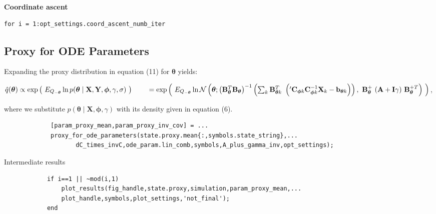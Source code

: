 \item \textbf{Coordinate ascent}
\color{RoyalPurple}\begin{verbatim}
for i = 1:opt_settings.coord_ascent_numb_iter
\end{verbatim} 
\color{black}
\subsection{Proxy for ODE Parameters}


 Expanding the proxy distribution in equation (11) for $\boldsymbol\theta$ yields:
    \vspace{1em}
    \begin{par}
$\hat{q}(\boldsymbol\theta) \propto \exp
\left( ~E_{Q_{-\boldsymbol\theta}}     \ln p(\boldsymbol\theta \mid \mathbf{X},\mathbf{Y},\boldsymbol\phi,\gamma,\mathbf\sigma)
~     \right) \\ \qquad= \exp \left( ~E_{Q_{-\boldsymbol\theta}} \ln \mathcal{N}\left(\boldsymbol\theta
; \left(    \mathbf{B}_{\boldsymbol\theta}^T \mathbf{B}_{\boldsymbol\theta} \right)^{-1}
\left( \sum_k    \mathbf{B}_{\boldsymbol\theta k}^T ~ \left( {'\mathbf{C}_{\boldsymbol\phi
k}}    \mathbf{C}_{\boldsymbol\phi k}^{-1} \mathbf{X}_k - \mathbf{b}_{\boldsymbol\theta
k} \right)    \right), ~ \mathbf{B}_{\boldsymbol\theta}^+ ~ (\mathbf{A} + \mathbf{I}\gamma)
~    \mathbf{B}_{\boldsymbol\theta}^{+T} \right) ~\right)$,
    \end{par}
    \vspace{1em}
    
where we substitute $p(\boldsymbol\theta \mid \mathbf{X},\boldsymbol\phi,\gamma)$ with its density given in equation (6).

    \color{RoyalPurple}\begin{verbatim}
             [param_proxy_mean,param_proxy_inv_cov] = ...
             proxy_for_ode_parameters(state.proxy.mean{:,symbols.state_string},...
                    dC_times_invC,ode_param.lin_comb,symbols,A_plus_gamma_inv,opt_settings);
\end{verbatim} 
\color{black}
\begin{par}
Intermediate results
\end{par} \vspace{1em}
\color{RoyalPurple}\begin{verbatim}
            if i==1 || ~mod(i,1)
                plot_results(fig_handle,state.proxy,simulation,param_proxy_mean,...
                plot_handle,symbols,plot_settings,'not_final');
            end
\end{verbatim} 
\color{black}

